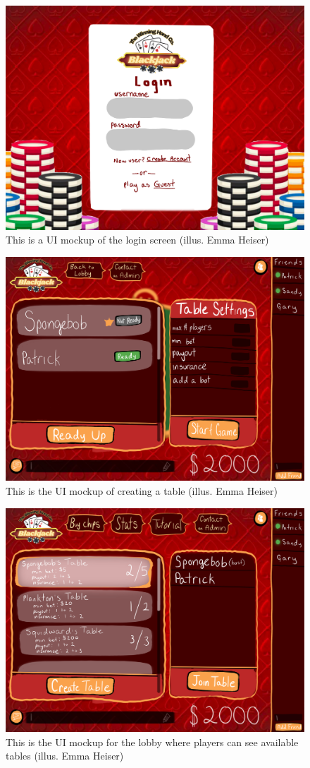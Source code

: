 \begin{figure}[hbt!]
    \centering
    \includegraphics[width=0.75\linewidth]{figures/login.png}
    \caption{This is a UI mockup of the login screen (illus. Emma Heiser)}
    \label{fig:login}
\end{figure}

\begin{figure}[hbt!]
    \centering
    \includegraphics[width=0.75\linewidth]{figures/at-table.png}
    \caption{This is the UI mockup of creating a table (illus. Emma Heiser)}
    \label{fig:table}
\end{figure}

\pagebreak

\begin{figure}[hbt!]
    \centering
    \includegraphics[width=0.75\linewidth]{figures/lobby.png}
    \caption{This is the UI mockup for the lobby where players can see available tables (illus. Emma Heiser)}
    \label{fig:lobby}
\end{figure}

